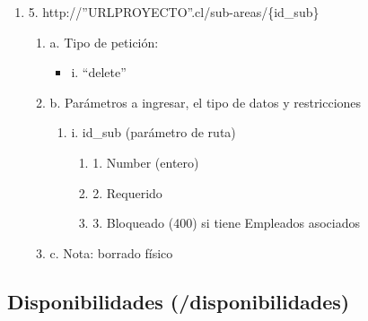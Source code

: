 \begin{enumerate}
    \item 5. http://”URLPROYECTO”.cl/sub-areas/\{id\_sub\}
    \begin{enumerate}
        \item a. Tipo de petición:
            \begin{itemize}
               \item i. “delete”
            \end{itemize}
        \item b. Parámetros a ingresar, el tipo de datos y restricciones
            \begin{enumerate}
                \item i. id\_sub (parámetro de ruta)
                    \begin{enumerate}
                        \item 1. Number (entero)
                        \item 2. Requerido
                        \item 3. Bloqueado (400) si tiene Empleados asociados
                    \end{enumerate}
            \end{enumerate}
        \item c. Nota: borrado físico
    \end{enumerate}
\end{enumerate}

\subsection{Disponibilidades (/disponibilidades)}

